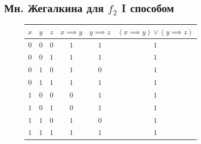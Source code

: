 \documentclass[12pt,a4paper]{article}
\theoremstyle{plain}
\theoremstyle{definition}
\theoremstyle{remark}
\numberwithin{equation}{section}
\begin{document}
\subsection{Мн. Жегалкина для $f_2$ I способом}

\begin{figure}[H]
  \begin{minipage}[t]{0.55\textwidth}
    \vspace{0em}
    \begin{tabularx}{\textwidth}{|c|c|c|c|c|C|}
      \hline
      $x$ & $y$ & $z$ & $x \implies y$ & $y \implies z$ & $(x \implies y) \lor (y \implies z)$ \\
      \hline
      $0$ & $0$ & $0$ & $1$ & $1$ & $1$ \\
      $0$ & $0$ & $1$ & $1$ & $1$ & $1$ \\  
      $0$ & $1$ & $0$ & $1$ & $0$ & $1$ \\
      $0$ & $1$ & $1$ & $1$ & $1$ & $1$ \\
      $1$ & $0$ & $0$ & $0$ & $1$ & $1$ \\
      $1$ & $0$ & $1$ & $0$ & $1$ & $1$ \\
      $1$ & $1$ & $0$ & $1$ & $0$ & $1$ \\
      $1$ & $1$ & $1$ & $1$ & $1$ & $1$ \\
      \hline  
    \end{tabularx}
    

\end{minipage}
\end{figure}
\end{document}

